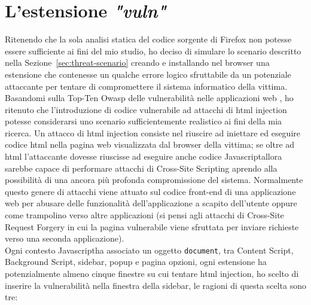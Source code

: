 \documentclass{sapthesis}
\newcommand{\code}[1]{\texttt{#1}}
\newcommand{\Sezione}[1]{Sezione~\ref{#1}}
\newcommand{\vuln}{\textit{"vuln"}}
\newcommand{\JS}{Javascript}
\begin{document}
    \section{L'estensione \vuln}
    \label{sec:estensione-vuln}
        Ritenendo che la sola analisi statica del codice sorgente di Firefox non potesse essere
        sufficiente ai fini del mio studio, ho deciso di simulare lo scenario descritto nella
        \Sezione{sec:threat-scenario} creando e installando nel browser una estensione che contenesse
        un qualche errore logico sfruttabile da un potenziale attaccante per tentare di compromettere
        il sistema informatico della vittima.
        Basandomi sulla Top-Ten Owasp delle vulnerabilità nelle applicazioni web \cite{owasp-top-ten}, ho ritenuto
        che l'introduzione di codice vulnerabile ad attacchi di html injection potesse considerarsi uno scenario
        sufficientemente realistico ai fini della mia ricerca.
        Un attacco di html injection consiste nel riuscire ad iniettare ed eseguire codice html nella pagina web
        visualizzata dal browser della vittima; se oltre ad html l'attaccante dovesse riuscisse ad eseguire anche 
        codice \JS allora sarebbe capace di performare attacchi di Cross-Site Scripting aprendo alla possibilità
        di una ancora più profonda compromissione del sistema. Normalmente questo genere di attacchi viene
        attuato sul codice front-end di una applicazione web per abusare delle funzionalità dell'applicazione
        a scapito dell'utente oppure come trampolino verso altre applicazioni (si pensi agli
        attacchi di Cross-Site Request Forgery in cui la pagina vulnerabile viene sfruttata per
        inviare richieste verso una seconda applicazione).\\
        Ogni contesto \JS ha associato un oggetto \code{document}, tra Content Script, Background Script, sidebar,
        popup e pagina opzioni, ogni estensione ha potenzialmente almeno cinque finestre su cui tentare
        html injection, ho scelto di inserire la vulnerabilità nella finestra della sidebar, le ragioni di
        questa scelta sono tre:
\end{document}
